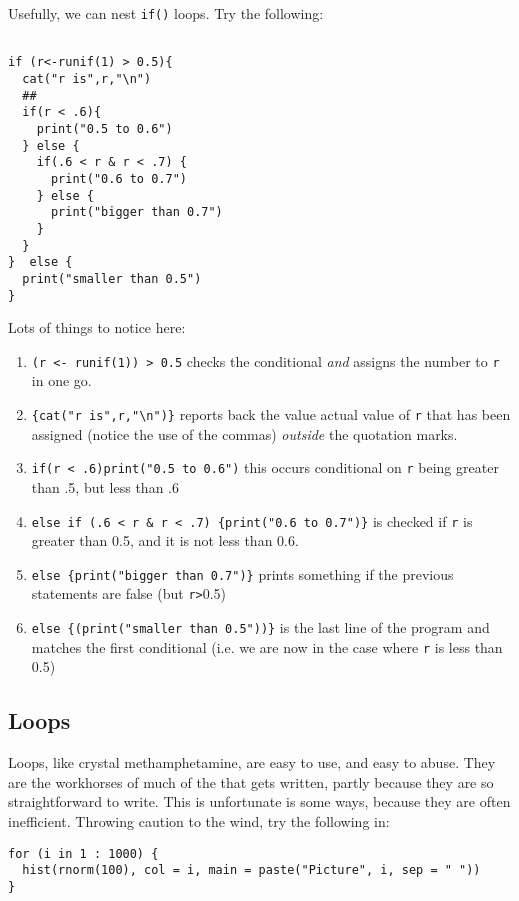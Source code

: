 Usefully, we can nest \texttt{if()} loops.  Try the following:
\begin{verbatim}

if (r<-runif(1) > 0.5){
  cat("r is",r,"\n")
  ##  
  if(r < .6){
    print("0.5 to 0.6")
  } else {
    if(.6 < r & r < .7) {
      print("0.6 to 0.7")
    } else {
      print("bigger than 0.7")
    }
  }
}  else {
  print("smaller than 0.5")
}

\end{verbatim}

Lots of things to notice here:
\begin{enumerate}
\item \texttt{(r <- runif(1)) > 0.5} checks the conditional \textit{and}
assigns the number to \texttt{r} in one go.

\item \verb!{cat("r is",r,"\n")}! reports back the value actual
value  of \texttt{r} that has been assigned (notice the use of the
commas) \textit{outside} the quotation marks.

\item \texttt{if(r < .6){print("0.5 to 0.6")}} this occurs conditional
on \texttt{r} being greater than .5, but less than .6

\item \verb!else if (.6 < r & r < .7) {print("0.6 to 0.7")}! is checked if
\texttt{r} is greater than 0.5, and it is not less than 0.6.

\item \verb!else {print("bigger than 0.7")}! prints something if
the previous statements are false (but \texttt{r>}0.5)

\item \verb!else {(print("smaller than 0.5"))}! is the last line of
the program and matches the first conditional (i.e. we are now in
the case where \texttt{r} is less than 0.5)
\end{enumerate}

\subsection{Loops}
Loops, like crystal methamphetamine, are easy to use, and easy to
abuse. They are the workhorses of much of the \R that gets written,
partly because they are so straightforward to write.  This is
unfortunate is some ways, because they are often inefficient.
Throwing caution to the wind, try the following in:

\begin{verbatim}
for (i in 1 : 1000) {
  hist(rnorm(100), col = i, main = paste("Picture", i, sep = " "))
}
\end{verbatim}

